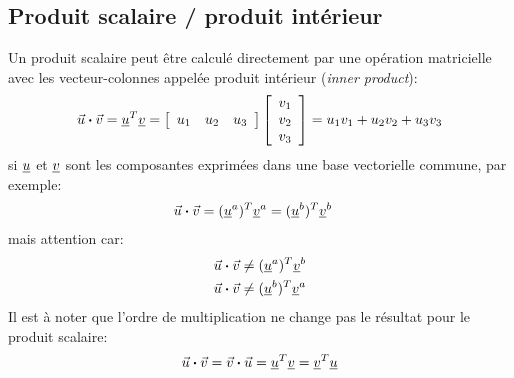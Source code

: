 \subsection{Produit scalaire / produit intérieur}
Un produit scalaire peut être calculé directement par une opération matricielle avec les vecteur-colonnes appelée produit intérieur (\textit{inner product}):
\begin{equation}
 \vec{u} \boldsymbol{\cdot} \vec{v} = \underline{u}^T \underline{v} = \left[ \begin{array}{c c c} u_1 & u_2 & u_3  \end{array} \right]  \left[ \begin{array}{c} v_1 \\ v_2 \\ v_3  \end{array} \right]
 = u_1 v_1 + u_2 v_2 + u_3 v_3
\end{equation}
si $\underline{u}$ et $\underline{v}$ sont les composantes exprimées dans une base vectorielle commune, par exemple:
\begin{align}
 \vec{u} \boldsymbol{\cdot} \vec{v} &= (\underline{u}^a)^T \underline{v}^a = (\underline{u}^b)^T \underline{v}^b
\end{align}
mais attention car:
\begin{align}
 \vec{u} \boldsymbol{\cdot} \vec{v} &\ne (\underline{u}^a)^T \underline{v}^b \\
 \vec{u} \boldsymbol{\cdot} \vec{v} &\ne (\underline{u}^b)^T \underline{v}^a
\end{align}
Il est à noter que l'ordre de multiplication ne change pas le résultat pour le produit scalaire:
\begin{equation}
 \vec{u} \boldsymbol{\cdot} \vec{v} = \vec{v} \boldsymbol{\cdot} \vec{u} = \underline{u}^T \underline{v} = \underline{v}^T \underline{u}
\end{equation}

